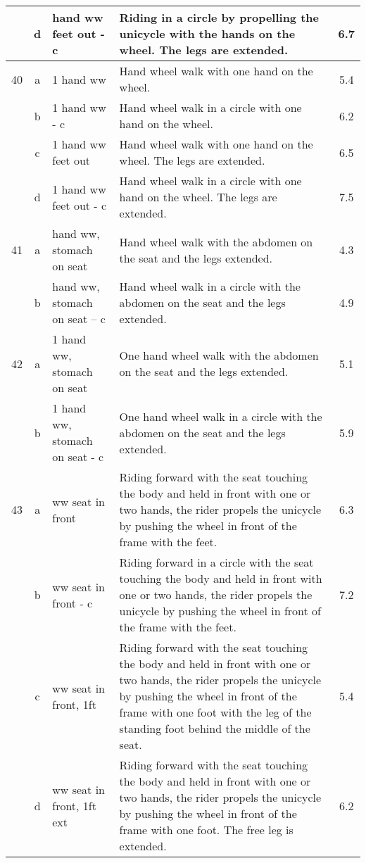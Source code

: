 \begin{longtable}{|r|c|p{4cm}|p{8cm}|c|}
\hline
  & d & hand ww feet out - c  & Riding in a circle by propelling the unicycle with the hands on the wheel. The legs are extended. & 6.7 \\ 
\hline
40  & a & 1 hand ww & Hand wheel walk with one hand on the wheel. & 5.4 \\ 
\hline
  & b & 1 hand ww - c & Hand wheel walk in a circle with one hand on the wheel. & 6.2 \\ 
\hline
  & c & 1 hand ww feet out  & Hand wheel walk with one hand on the wheel. The legs are extended.  & 6.5 \\ 
\hline
  & d & 1 hand ww feet out - c  & Hand wheel walk in a circle with one hand on the wheel. The legs are extended.  & 7.5 \\ 
\hline
41  & a & hand ww, stomach on seat  & Hand wheel walk with the abdomen on the seat and the legs extended. & 4.3 \\ 
\hline
  & b & hand ww, stomach on seat – c  & Hand wheel walk in a circle with the abdomen on the seat and the legs extended. & 4.9 \\ 
\hline
42  & a & 1 hand ww, stomach on seat  & One hand wheel walk with the abdomen on the seat and the legs extended. & 5.1 \\ 
\hline
  & b & 1 hand ww, stomach on seat - c  & One hand wheel walk in a circle with the abdomen on the seat and the legs extended. & 5.9 \\ 
\hline
43  & a & ww seat in front  & Riding forward with the seat touching the body and held in front with one or two hands, the rider propels the unicycle by pushing the wheel in front of the frame with the feet.  & 6.3 \\ 
\hline
  & b & ww seat in front - c  & Riding forward in a circle with the seat touching the body and held in front with one or two hands, the rider propels the unicycle by pushing the wheel in front of the frame with the feet.  & 7.2 \\ 
\hline
  & c & ww seat in front, 1ft & Riding forward with the seat touching the body and held in front with one or two hands, the rider propels the unicycle by pushing the wheel in front of the frame with one foot with the leg of the standing foot behind the middle of the seat.  & 5.4 \\ 
\hline
  & d & ww seat in front, 1ft ext & Riding forward with the seat touching the body and held in front with one or two hands, the rider propels the unicycle by pushing the wheel in front of the frame with one foot. The free leg is extended.  & 6.2 \\ 

\end{longtable}
